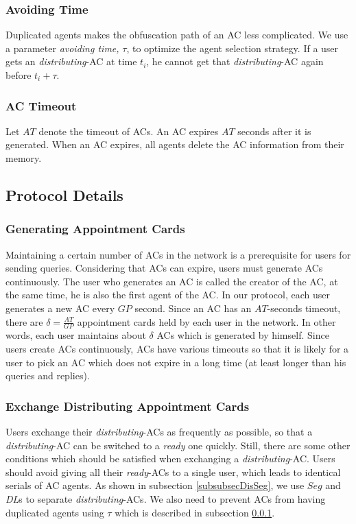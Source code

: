 \documentclass[conference]{IEEEtran}
\begin{document}
\subsubsection{ Avoiding Time} \label{subsubsecAvdTime}

Duplicated agents makes the obfuscation path of an AC less complicated. We use a parameter \textit{avoiding time,} $\tau$, to optimize the agent selection strategy. If a user gets an \textit{distributing}-AC at time $t_i$, he cannot get that \textit{distributing}-AC again before $t_i+\tau $.

\subsubsection{ AC Timeout}

Let $AT$ denote the timeout of ACs. An AC expires $AT$ seconds after it is generated. When an AC expires, all agents delete the AC information from their memory.

\subsection{ Protocol Details}


\subsubsection{ Generating Appointment Cards}

Maintaining a certain number of ACs in the network is a prerequisite for users for sending queries. Considering that ACs can expire, users must generate ACs continuously. The user who generates an AC is called the creator of the AC, at the same time, he is also the first agent of the AC. In our protocol, each user generates a new AC every $GP$ second. Since an AC has an $AT$-seconds timeout, there are $\delta =\frac{AT}{GP}$ appointment cards held by each user in the network. In other words, each user maintains about $\delta$ ACs which is generated by himself. Since users create ACs continuously, ACs have various timeouts so that it is likely for a user to pick an AC which does not expire in a long time (at least longer than his queries and replies).


\subsubsection{ Exchange Distributing Appointment Cards}\label{subsec_ExchangeDisAptCrd}

Users exchange their \textit{distributing}-ACs as frequently as possible, so that a \textit{distributing}-AC can be switched to a \textit{ready} one quickly. Still, there are some other conditions which should be satisfied when exchanging a \textit{distributing}-AC. Users should avoid giving all their \textit{ready}-ACs to a single user, which leads to identical serials of AC agents. As shown in subsection \ref{subsubsecDisSeg}, we use $Seg$ and \textit{DL}s to separate \textit{distributing}-ACs. We also need to prevent ACs from having duplicated agents using $\tau$ which is described in subsection \ref{subsubsecAvdTime}.
\end{document}
